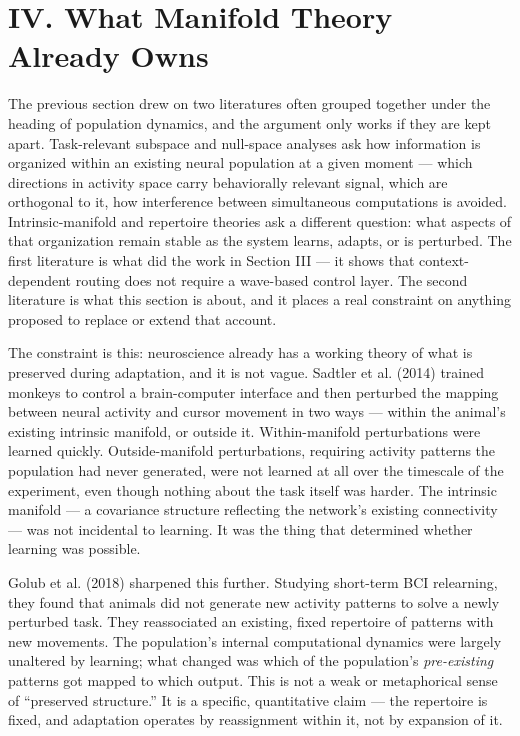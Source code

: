 \documentclass[11pt]{article}
\begin{document}
\section*{IV. What Manifold Theory Already Owns}

The previous section drew on two literatures often grouped together under the heading of population dynamics, and the argument only works if they are kept apart. Task-relevant subspace and null-space analyses ask how information is organized within an existing neural population at a given moment — which directions in activity space carry behaviorally relevant signal, which are orthogonal to it, how interference between simultaneous computations is avoided. Intrinsic-manifold and repertoire theories ask a different question: what aspects of that organization remain stable as the system learns, adapts, or is perturbed. The first literature is what did the work in Section III — it shows that context-dependent routing does not require a wave-based control layer. The second literature is what this section is about, and it places a real constraint on anything proposed to replace or extend that account.

The constraint is this: neuroscience already has a working theory of what is preserved during adaptation, and it is not vague. Sadtler et al. (2014) trained monkeys to control a brain-computer interface and then perturbed the mapping between neural activity and cursor movement in two ways — within the animal's existing intrinsic manifold, or outside it. Within-manifold perturbations were learned quickly. Outside-manifold perturbations, requiring activity patterns the population had never generated, were not learned at all over the timescale of the experiment, even though nothing about the task itself was harder. The intrinsic manifold — a covariance structure reflecting the network's existing connectivity — was not incidental to learning. It was the thing that determined whether learning was possible.

Golub et al. (2018) sharpened this further. Studying short-term BCI relearning, they found that animals did not generate new activity patterns to solve a newly perturbed task. They reassociated an existing, fixed repertoire of patterns with new movements. The population's internal computational dynamics were largely unaltered by learning; what changed was which of the population's \textit{pre-existing} patterns got mapped to which output. This is not a weak or metaphorical sense of ``preserved structure.'' It is a specific, quantitative claim — the repertoire is fixed, and adaptation operates by reassignment within it, not by expansion of it.
\end{document}
